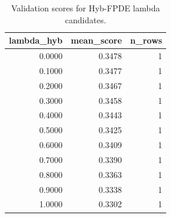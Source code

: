 \begin{table}[t]
\caption{Validation scores for Hyb-FPDE lambda candidates.}
\label{tab:lambda_distribution_computed}
\centering
\begin{tabular}{rrr}
\toprule
lambda\_hyb & mean\_score & n\_rows \\
\midrule
0.0000 & 0.3478 & 1 \\
0.1000 & 0.3477 & 1 \\
0.2000 & 0.3467 & 1 \\
0.3000 & 0.3458 & 1 \\
0.4000 & 0.3443 & 1 \\
0.5000 & 0.3425 & 1 \\
0.6000 & 0.3409 & 1 \\
0.7000 & 0.3390 & 1 \\
0.8000 & 0.3363 & 1 \\
0.9000 & 0.3338 & 1 \\
1.0000 & 0.3302 & 1 \\
\bottomrule
\end{tabular}

\end{table}
